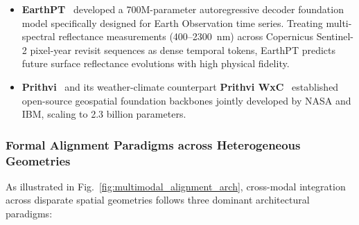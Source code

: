 \begin{itemize}
    \item \textbf{EarthPT}~\cite{smith2023earthpt} developed a 700M-parameter autoregressive decoder foundation model specifically designed for Earth Observation time series. Treating multi-spectral reflectance measurements (400--2300~nm) across Copernicus Sentinel-2 pixel-year revisit sequences as dense temporal tokens, EarthPT predicts future surface reflectance evolutions with high physical fidelity.
    \item \textbf{Prithvi}~\cite{jakubik2023prithvi} and its weather-climate counterpart \textbf{Prithvi WxC}~\cite{schmude2024prithviwxc} established open-source geospatial foundation backbones jointly developed by NASA and IBM, scaling to 2.3 billion parameters.
\end{itemize}

\subsubsection{Formal Alignment Paradigms across Heterogeneous Geometries}
As illustrated in Fig.~\ref{fig:multimodal_alignment_arch}, cross-modal integration across disparate spatial geometries follows three dominant architectural paradigms:
